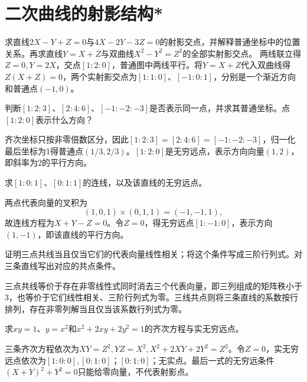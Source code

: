 \par\addvspace{12pt}

\section{二次曲线的射影结构*}

求直线\(2X-Y+Z=0\)与\(4X-2Y-3Z=0\)的射影交点，并解释普通坐标中的位置关系。再求直线\(Y=X+Z\)与双曲线\(X^2-Y^2=Z^2\)的全部实射影交点。
\solutionanswer
两线联立得\(Z=0,Y=2X\)，交点\([1:2:0]\)，普通图中两线平行。将\(Y=X+Z\)代入双曲线得\(Z(X+Z)=0\)，两个实射影交点为\([1:1:0]\)、\([-1:0:1]\)，分别是一个渐近方向和普通点\((-1,0)\)。


判断\([1:2:3]\)、\([2:4:6]\)、\([-1:-2:-3]\)是否表示同一点，并求其普通坐标。点\([1:2:0]\)表示什么方向？
\par
\solutionanswer
齐次坐标只按非零倍数区分，因此\([1:2:3]=[2:4:6]=[-1:-2:-3]\)，归一化最后坐标为1得普通点\((1/3,2/3)\)。\([1:2:0]\)是无穷远点，表示方向向量\((1,2)\)，即斜率为2的平行方向。


求\([1:0:1]\)、\([0:1:1]\)的连线，以及该直线的无穷远点。
\par
\solutionanswer
两点代表向量的叉积为
\[(1,0,1)\times(0,1,1)=(-1,-1,1),\]
故连线方程为\(X+Y-Z=0\)。令\(Z=0\)，得无穷远点\([1:-1:0]\)，表示方向\((1,-1)\)，即该直线的平行方向。


证明三点共线当且仅当它们的代表向量线性相关；将这个条件写成三阶行列式。对三条直线写出对应的共点条件。
\par
\solutionanswer
三点共线等价于存在非零线性式同时消去三个代表向量，即三列组成的矩阵秩小于\(3\)，也等价于它们线性相关、三阶行列式为零。三线共点则将三条直线的系数按行排列，存在非零列解当且仅当该系数行列式为零。


求\(xy=1\)、\(y=x^2\)和\(x^2+2xy+2y^2=1\)的齐次方程与实无穷远点。
\par
\solutionanswer
三条齐次方程依次为\(XY=Z^2,YZ=X^2,X^2+2XY+2Y^2=Z^2\)。令\(Z=0\)，实无穷远点依次为\([1:0:0],[0:1:0]\)；\([0:1:0]\)；无实点。最后一式的无穷远条件\((X+Y)^2+Y^2=0\)只能给零向量，不代表射影点。


